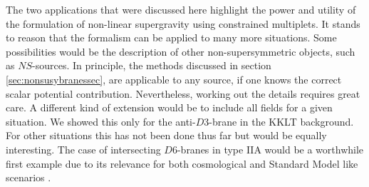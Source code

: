\documentclass[a4paper,12pt,twoside,openright]{report}
\begin{document}
The two applications that were discussed here highlight the power and utility of the formulation of non-linear supergravity using constrained multiplets. It stands to reason that the formalism can be applied to many more situations. Some possibilities would be the description of other non-supersymmetric objects, such as $NS$-sources. In principle, the methods discussed in section \ref{sec:nonsusybranessec}, are applicable to any source, if one knows the correct scalar potential contribution. Nevertheless, working out the details requires great care. A different kind of extension would be to include all fields for a given situation. We showed this only for the anti-$D3$-brane in the KKLT background. For other situations this has not been done thus far but would be equally interesting. The case of intersecting $D6$-branes in type IIA would be a worthwhile first example due to its relevance for both cosmological and Standard Model like scenarios \cite{Grana:2005jc,Douglas:2006es,Blumenhagen:2006ci,Blumenhagen:2005mu}.\\
\end{document}
